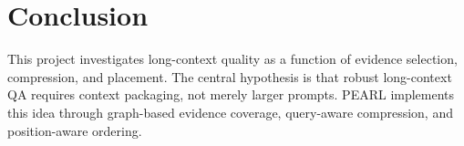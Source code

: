 \section{Conclusion}

This project investigates long-context quality as a function of evidence
selection, compression, and placement. The central hypothesis is that robust
long-context QA requires context packaging, not merely larger prompts. PEARL
implements this idea through graph-based evidence coverage, query-aware
compression, and position-aware ordering.
